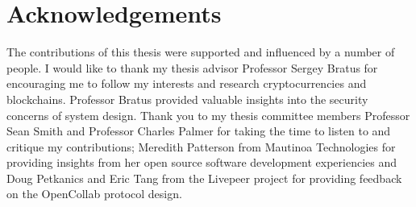 \section*{Acknowledgements}

The contributions of this thesis were supported and influenced by a number of
people. I would like to thank my thesis advisor Professor Sergey Bratus for encouraging me
to follow my interests and research cryptocurrencies and blockchains. Professor Bratus
provided valuable insights into the security concerns of system design. Thank
you to my thesis committee members Professor Sean Smith and Professor Charles
Palmer for taking the time to listen to and critique my contributions; Meredith
Patterson from Mautinoa Technologies for providing insights from her open source
software development experiencies and Doug
Petkanics and Eric Tang from the Livepeer project for providing feedback on the
OpenCollab protocol design.

